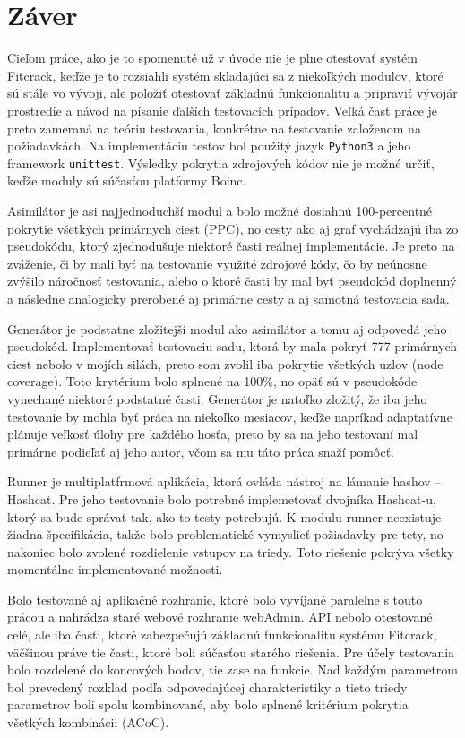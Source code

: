 \chapter{Záver}
Cieľom práce, ako je to spomenuté už v úvode nie je plne otestovať systém Fitcrack, keďže je to rozsiahli systém skladajúci sa z niekoľkých modulov, ktoré sú stále vo vývoji, ale položiť otestovať základnú funkcionalitu a pripraviť vývojár prostredie a návod na písanie ďalších testovacích prípadov.
Veľká čast práce je preto zameraná na teóriu testovania, konkrétne na testovanie založenom na požiadavkách.
Na implementáciu testov bol použitý jazyk \texttt{Python3} a jeho framework \texttt{unittest}.
Výsledky pokrytia zdrojových kódov nie je možné určiť, keďže moduly sú súčasťou platformy Boinc.

Asimilátor je asi najjednoduchší modul a bolo možné dosiahnú 100-percentné pokrytie všetkých primárnych ciest (PPC), no cesty ako aj graf vychádzajú iba zo pseudokódu, ktorý zjednodušuje niektoré časti reálnej implementácie.
Je preto na zváženie, či by mali byť na testovanie využíté zdrojové kódy, čo by neúnosne zvýšilo náročnosť testovania, alebo o ktoré časti by mal byť pseudokód doplnenný a následne analogicky prerobené aj primárne cesty a aj samotná testovacia sada.

Generátor je podstatne zložitejší modul ako asimilátor a tomu aj odpovedá jeho pseudokód.
Implementovať testovaciu sadu, ktorá by mala pokryť 777 primárnych ciest nebolo v mojích silách, preto som zvolil iba pokrytie všetkých uzlov (node coverage).
Toto krytérium bolo splnené na 100\%, no opäť sú v pseudokóde vynechané niektoré podstatné časti.
Generátor je natoľko zložitý, že iba jeho testovanie by mohla byť práca na niekoľko mesiacov, keďže napríkad adaptatívne plánuje veľkosť úlohy pre každého hosťa, preto by sa na jeho testovaní mal primárne podieľať aj jeho autor, včom sa mu táto práca snaží pomôcť.

Runner je multiplatfrmová aplikácia, ktorá ovláda nástroj na lámanie hashov -- Hashcat.
Pre jeho testovanie bolo potrebné implemetovať dvojníka Hashcat-u, ktorý sa bude správať tak, ako to testy potrebujú.
K modulu runner neexistuje žiadna špecifikácia, takže bolo problematické vymyslieť požiadavky pre tety, no nakoniec bolo zvolené rozdielenie vstupov na triedy. 
Toto riešenie pokrýva všetky momentálne implementované možnosti.

Bolo testované aj aplikačné rozhranie, ktoré bolo vyvíjané paralelne s touto prácou a nahrádza staré webové rozhranie webAdmin. 
API nebolo otestované celé, ale iba časti, ktoré zabezpečujú základnú funkcionalitu systému Fitcrack, väčšinou práve tie časti, ktoré boli súčasťou starého riešenia.
Pre účely testovania bolo rozdelené do koncových bodov, tie zase na funkcie.
Nad každým parametrom bol prevedený rozklad podľa odpovedajúcej charakteristiky a tieto triedy parametrov boli spolu kombinované, aby bolo splnené kritérium pokrytia všetkých kombinácii (ACoC).

